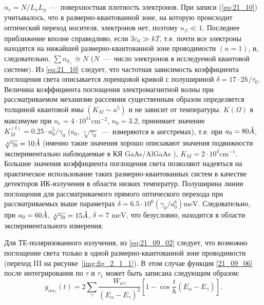 $n_e =N/L_x L_y $~---~поверхностная плотность электронов. При записи (\ref{eq:21_10}) учитывалось, что в размерно-квантованной зоне, на которую происходит оптический переход носителя, электронов нет, поэтому $n_{\beta } \ll 1$. Последнее приближение вполне справедливо, если  $3\varepsilon_0 \gg kT$, т.е. почти все электроны находятся на нижайшей размерно-квантованной зоне проводимости $(n=1)$, и, следовательно, $\sum n_{k_{\bot } } \cong N$ ($N$~---~число электронов в исследуемой квантовой системе). Из \eqref{eq:21_10} следует, что частотная зависимость коэффициента поглощения света описывается лоренцовой кривой с полушириной  $\delta =17\cdot 2\hbar /\tau_0 $. Величина коэффициента поглощения электромагнитной волны при рассматриваемом механизме рассеяния существенным образом определяется толщиной квантовой ямы $\left(K_M \sim a^5 \right)$ и не зависит от температуры. $K\left(\Omega \right)$  в максимуме при $n_e =4\cdot 10^{11} \text{cm}^{-2} $, $n_0 = 3.2$,   принимает значение   $K_M^{\left(\delta \right)} =0.25\cdot a_0^5 /\gamma_0 $ ($a_0 $, $\sqrt[4]{\gamma_0}$~--–~измеряются в ангстремах), т.е. при  $a_0 = 80 \AA$,  $\sqrt[4]{\gamma_0} = 10 \AA$ (именно такие значения   хорошо описывают значения подвижности   экспериментально наблюдаемые в КЯ GaAs/AlGaAs \cite{West1985}), $K_M =2\cdot 10^4 \text{cm}^{-1} $. Большие значения коэффициента поглощения света позволяют надеяться на практическое использование таких размерно-квантованных систем в качестве детекторов ИК-излучения в области низких температур. Полуширина линии поглощения для рассматриваемого прямого оптического перехода при рассматриваемых выше параметрах $\delta =6.5\cdot 10^6 \left(\gamma_0 /a_0^6 \right)\text{meV}$. Следовательно, при  $a_0 = 60 \AA$,  $\sqrt[4]{\gamma_0} = 15 \AA$,  $\delta = 7 \text{ meV}$, что безусловно, находится в области экспериментального измерения.

Для ТЕ-поляризованного излучения, из \eqref{eq:21_09_02} следует, что  возможно поглощение света только в одной размерно-квантованной зоне проводимости (переход III на рисунке~\ref{img:fig_2_1_1}). В этом случае функция \eqref{21_09_06} после интегрирования по $\tau$ и $\tau_1$ может быть записана следующим образом:
\begin{equation} \label{eq:21_09_12}
g_{\alpha\alpha_1 }(t) =2 \sum_{\gamma}  \frac{ W_{\alpha\gamma }}{\left(E_{\alpha} - E_{\gamma} \right)^2 } \left[1 - \cos{\frac{t}{\hbar} \left( E_{\alpha} - E_{\gamma} \right) } \right] .
\end{equation}

